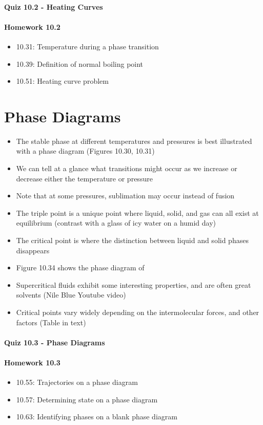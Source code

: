 \documentclass[12pt, openany, letterpaper]{memoir}
\begin{document}
\paragraph*{Quiz 10.2 - Heating Curves}
\paragraph*{Homework 10.2}
\begin{itemize}
  \item 10.31: Temperature during a phase transition
  \item 10.39: Definition of normal boiling point
  \item 10.51: Heating curve problem
\end{itemize}

\section{Phase Diagrams}
\begin{itemize}
  \item The stable phase at different temperatures and pressures is best illustrated with a phase diagram (Figures 10.30, 10.31)
  \item We can tell at a glance what transitions might occur as we increase or decrease either the temperature or pressure
  \item Note that at some pressures, sublimation may occur instead of fusion
  \item The triple point is a unique point where liquid, solid, and gas can all exist at equilibrium (contrast with a glass of icy water on a humid day)
  \item The critical point is where the distinction between liquid and solid phases disappears
  \item Figure 10.34 shows the phase diagram of 
  \item Supercritical fluids exhibit some interesting properties, and are often great solvents (Nile Blue Youtube video)
  \item Critical points vary widely depending on the intermolecular forces, and other factors (Table in text)
\end{itemize}
\paragraph*{Quiz 10.3 - Phase Diagrams}
\paragraph*{Homework 10.3}
\begin{itemize}
  \item 10.55: Trajectories on a phase diagram
  \item 10.57: Determining state on a phase diagram
  \item 10.63: Identifying phases on a blank phase diagram
\end{itemize}
\end{document}
